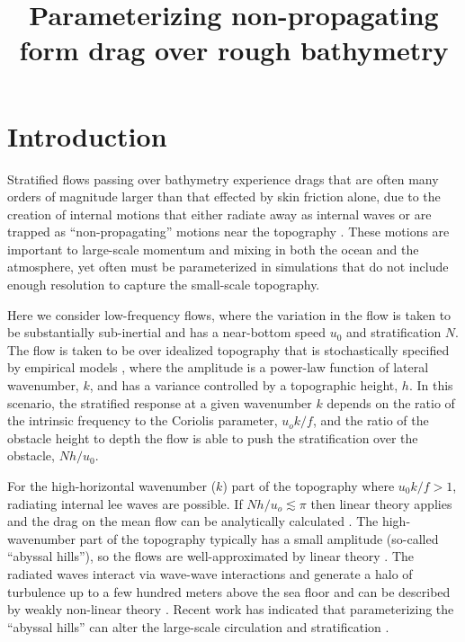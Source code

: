\documentclass[twocol]{ametsocV5}
\title{Parameterizing non-propagating form drag over rough bathymetry}
\affiliation{University of Victoria, Victoria, BC, Canada}
\begin{document}
\maketitle

\section{Introduction}

Stratified flows passing over bathymetry experience drags that are often many orders of magnitude larger than that effected by skin friction alone, due to the creation of internal motions that either radiate away as internal waves \citep{bell75a} or are trapped as ``non-propagating'' motions near the topography \citep[i.e.][]{bacmeisterpierrhumbert88}. These motions are important to large-scale momentum and mixing in both the ocean and the atmosphere, yet often  must be parameterized in simulations that do not include enough resolution to capture the small-scale topography.

Here we consider low-frequency flows, where the variation in the flow is taken to be substantially sub-inertial and has a near-bottom speed $u_0$ and stratification $N$.    The flow is taken to be over idealized topography that is stochastically specified by empirical models \citep[e.g.][]{goffarbic10}, where the amplitude is a power-law function of lateral wavenumber, $k$, and has a variance controlled by a topographic height, $h$.  In this scenario, the stratified response at a given wavenumber $k$ depends on the ratio of the intrinsic frequency to the Coriolis parameter, $u_o k / f$, and the ratio of the obstacle height to depth the flow is able to push the stratification over the obstacle, $Nh/u_0$.

For the high-horizontal wavenumber ($k$) part of the topography where $u_0k/f > 1$, radiating internal lee waves are possible.  If $Nh/u_o \lesssim \pi$ then linear theory applies and the drag on the mean flow can be analytically calculated \citep{bell75a}.  The high-wavenumber part of the topography typically has a small amplitude (so-called ``abyssal hills''), so the flows are well-approximated by linear theory \citep{nikurashinferrari10a,nikurashinferrari14}.  The radiated waves interact via wave-wave interactions and generate a halo of turbulence up to a few hundred meters above the sea floor and can be described by weakly non-linear theory \citep{polzin09}.  Recent work has indicated that parameterizing the ``abyssal hills'' can alter the large-scale circulation and stratification \citep[i.e.]{meletetal13, de_Lavergne_2017}.
\end{document}
